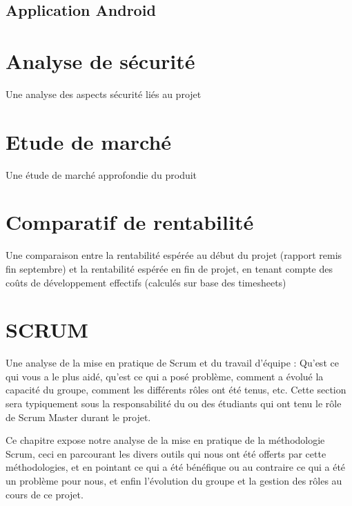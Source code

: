 \documentclass{report}
\begin{document}
	\section{Application Android}



\chapter{Analyse de sécurité} %


	Une analyse des aspects sécurité liés au projet


\chapter{Etude de marché} %


	Une étude de marché approfondie du produit

\chapter{Comparatif de rentabilité} %


	Une comparaison entre la rentabilité espérée au début du projet (rapport remis fin septembre) et la rentabilité espérée en fin de projet, en tenant compte des coûts de développement effectifs (calculés sur base des timesheets)

\chapter{SCRUM} %

	Une analyse de la mise en pratique de Scrum et du travail d’équipe : Qu’est ce qui vous a le plus aidé, qu’est ce qui a posé problème, comment a évolué la capacité du groupe, comment les différents rôles ont été tenus, etc.  Cette section sera typiquement sous la responsabilité du ou des étudiants qui ont tenu le rôle de Scrum Master durant le projet.

	Ce chapitre expose notre analyse de la mise en pratique de la méthodologie Scrum, ceci en parcourant les divers outils qui nous ont été offerts par cette méthodologies, et en pointant ce qui a été bénéfique ou au contraire ce qui a été un problème pour nous, et enfin l'évolution du groupe et la gestion des rôles au cours de ce projet.\\
\end{document}
